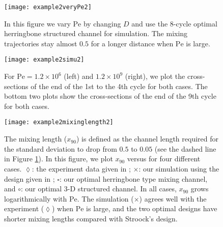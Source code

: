   \begin{figure}
    \centerline{
     \texttt{[image: example2veryPe2]}}
    \caption{\label{example2trajectory} In this figure we vary $\text{Pe}$ by changing $D$ and use the $8$-cycle optimal herringbone structured channel for simulation. The mixing trajectories stay almost $0.5$ for a longer distance when $\text{Pe}$ is large.}
  \end{figure}

  \begin{figure}
    \centerline{
     \texttt{[image: example2simu2]} 
    }
    \caption{\label{example2simu} For $\text{Pe} = 1.2\times10^6$ (left) and
$1.2\times10^9$ (right), we plot the cross-sections of the end of the
1st to the 4th cycle for both cases. The bottom two plots show the
cross-sections of the end of the 9th cycle for both cases. }
  \end{figure}

  \begin{figure}
    \centerline{
     \texttt{[image: example2mixinglength2]}
    }
    \caption{\label{example2mixinglength} The mixing length ($x_{90}$) is defined as the
    channel length required for the standard deviation to drop from $0.5$ to $0.05$
    (see the dashed line in Figure \ref{example2trajectory}). In this figure, we plot
    $x_{90}$ versus  for four different cases.
  $\lozenge$: the experiment data given in \cite{Stroock2002}; $\times$: our simulation
  using the design given in \cite{Stroock2002}; $\square$: our optimal herringbone type
  mixing channel, and $\circ$: our optimal 3-D structured channel. In all cases, $x_{90}$
  grows logarithmically with $\text{Pe}$. The simulation ($\times$) agrees well with the
  experiment ($\lozenge$) when $\text{Pe}$ is large, and the two optimal designs have shorter mixing lengths compared with Stroock's design.}
  \end{figure}

